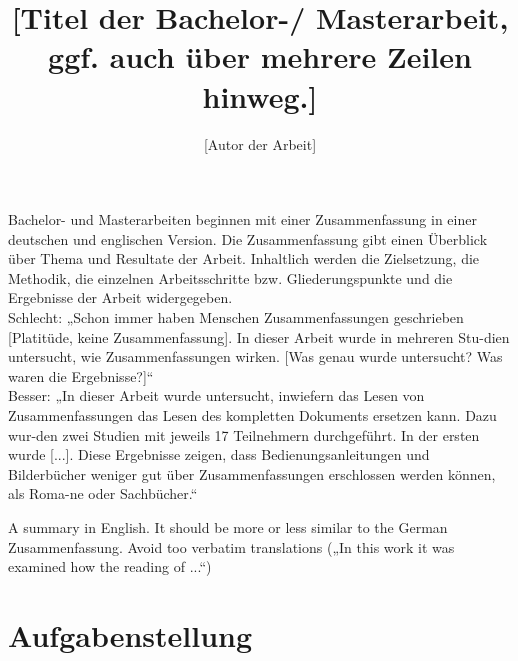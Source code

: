 \documentclass{mi-document/mi-graduation}
\title{[Titel der Bachelor-/ Masterarbeit, ggf. auch über mehrere Zeilen hinweg.]}
\author{[Autor der Arbeit]}
\begin{document}
\maketitle

\pagestyle{empty}

\newpage

\tableofcontents %
\newpage
\listoffigures %
\newpage
\lstlistoflistings %
\newpage

\summary
Bachelor- und Masterarbeiten beginnen mit einer Zusammenfassung in einer deutschen und englischen Version. Die Zusammenfassung gibt einen Überblick über Thema und Resultate der Arbeit. Inhaltlich werden die Zielsetzung, die Methodik, die einzelnen Arbeitsschritte bzw. Gliederungspunkte und die Ergebnisse der Arbeit widergegeben.\\
Schlecht: „Schon immer haben Menschen Zusammenfassungen geschrieben [Platitüde, keine Zusammenfassung]. In dieser Arbeit wurde in mehreren Stu-dien untersucht, wie Zusammenfassungen wirken. [Was genau wurde untersucht? Was waren die Ergebnisse?]“\\
Besser: „In dieser Arbeit wurde untersucht, inwiefern das Lesen von Zusammenfassungen das Lesen des kompletten Dokuments ersetzen kann. Dazu wur-den zwei Studien mit jeweils 17 Teilnehmern durchgeführt. In der ersten wurde [...]. Diese Ergebnisse zeigen, dass Bedienungsanleitungen und Bilderbücher weniger gut über Zusammenfassungen erschlossen werden können, als Roma-ne oder Sachbücher.“

\abstract
A summary in English. It should be more or less similar to the German Zusammenfassung. Avoid too verbatim translations („In this work it was examined how the reading of ...“)

\newpage
\section*{Aufgabenstellung}
\newpage
\pagestyle{fancy}
\end{document}
